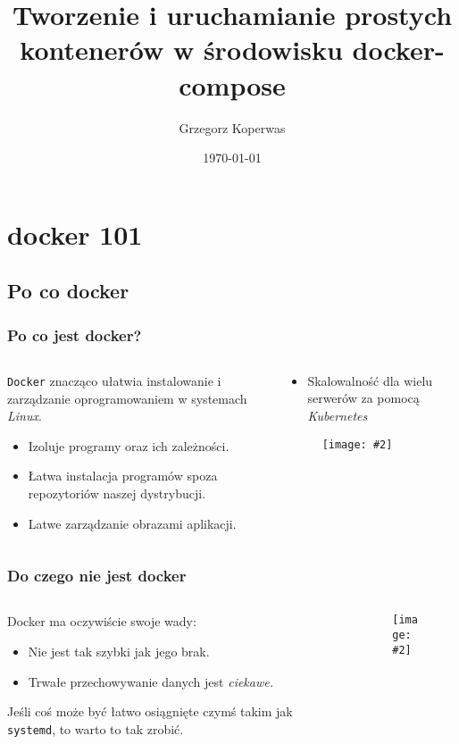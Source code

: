 \documentclass{beamer}
\title[docker oraz docker-compose 101]{Tworzenie i uruchamianie prostych kontenerów w środowisku  docker-compose}
\author{Grzegorz Koperwas}
\date{\today}
\newcommand{\obrazek}[2]{
\begin{figure}[h]
    \centering
    \texttt{[image: \#2]}
\end{figure}
}
\begin{document}
\begin{frame}
    \titlepage
\end{frame}
\begin{frame}
    \tableofcontents
\end{frame}
\section{docker 101}
\subsection{Po co docker}
\begin{frame}
    \frametitle{Po co jest docker?}

    \begin{columns}
        \begin{column}{0.5\textwidth}
            \texttt{Docker} znacząco ułatwia instalowanie i zarządzanie oprogramowaniem w systemach \emph{Linux}.
            \pause
            \begin{itemize}
                \item Izoluje programy oraz ich zależności.
                \pause
                \item Łatwa instalacja programów spoza repozytoriów naszej dystrybucji.
                \pause
                \item Latwe zarządzanie obrazami aplikacji.
            \end{itemize}
        \end{column}
        \begin{column}{0.5\textwidth}
            \pause
            \begin{itemize}
                \item Skalowalność dla wielu serwerów za pomocą \emph{Kubernetes}
            \end{itemize}
            \pause[0]
            \obrazek{0.27}{docker-arch.png}
        \end{column}
    \end{columns}
\end{frame}
\begin{frame}
    \frametitle{Do czego nie jest docker}
    \begin{columns}
        \begin{column}{0.5\textwidth}
            Docker ma oczywiście swoje wady:
            \pause
            \begin{itemize}
                \item Nie jest tak szybki jak jego brak.
                \pause
                \item Trwałe przechowywanie danych jest \emph{ciekawe.}
            \end{itemize}
            \pause
            Jeśli coś może być łatwo osiągnięte czymś takim jak \texttt{systemd}, to warto to tak zrobić.
        \end{column}
        \begin{column}{0.5\textwidth}
            \obrazek{0.15}{systemD.png}
        \end{column}
    \end{columns}
\end{frame}
\end{document}
